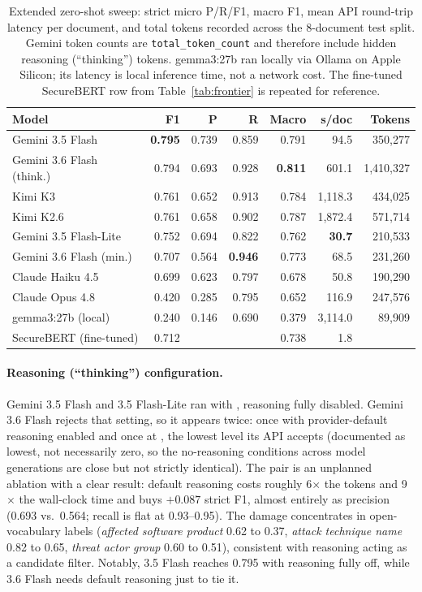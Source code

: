 \documentclass[11pt]{article}
\begin{document}
\begin{table}[t]
\centering
\scriptsize
\setlength{\tabcolsep}{2pt}
\begin{tabular}{lrrrrrr}
\toprule
Model & F1 & P & R & Macro & s/doc & Tokens \\
\midrule
Gemini 3.5 Flash & \textbf{0.795} & 0.739 & 0.859 & 0.791 & 94.5 & 350{,}277 \\
Gemini 3.6 Flash (think.) & 0.794 & 0.693 & 0.928 & \textbf{0.811} & 601.1 & 1{,}410{,}327 \\
Kimi K3 & 0.761 & 0.652 & 0.913 & 0.784 & 1{,}118.3 & 434{,}025 \\
Kimi K2.6 & 0.761 & 0.658 & 0.902 & 0.787 & 1{,}872.4 & 571{,}714 \\
Gemini 3.5 Flash-Lite & 0.752 & 0.694 & 0.822 & 0.762 & \textbf{30.7} & 210{,}533 \\
Gemini 3.6 Flash (min.) & 0.707 & 0.564 & \textbf{0.946} & 0.773 & 68.5 & 231{,}260 \\
Claude Haiku 4.5 & 0.699 & 0.623 & 0.797 & 0.678 & 50.8 & 190{,}290 \\
Claude Opus 4.8 & 0.420 & 0.285 & 0.795 & 0.652 & 116.9 & 247{,}576 \\
gemma3:27b (local) & 0.240 & 0.146 & 0.690 & 0.379 & 3{,}114.0 & 89{,}909 \\
\midrule
SecureBERT (fine-tuned) & 0.712 & & & 0.738 & 1.8 & \\
\bottomrule
\end{tabular}
\caption{Extended zero-shot sweep: strict micro P/R/F1, macro F1, mean
API round-trip latency per document, and total tokens recorded across the
8-document test split. Gemini token counts are
\texttt{total\_token\_count} and therefore include hidden reasoning
(``thinking'') tokens. gemma3:27b ran locally via Ollama on Apple
Silicon; its latency is local inference time, not a network cost. The
fine-tuned SecureBERT row from Table~\ref{tab:frontier} is repeated for
reference.}
\label{tab:frontier-extended}
\end{table}

\paragraph{Reasoning (``thinking'') configuration.} Gemini 3.5 Flash and
3.5 Flash-Lite ran with , reasoning fully
disabled. Gemini 3.6 Flash rejects that setting, so it appears twice: once
with provider-default reasoning enabled and once at
, the lowest level its API accepts
(documented as lowest, not necessarily zero, so the no-reasoning
conditions across model generations are close but not strictly
identical). The pair is an unplanned ablation with a clear result:
default reasoning costs roughly 6$\times$ the tokens and 9$\times$ the
wall-clock time and buys $+0.087$ strict F1, almost entirely as precision
(0.693 vs.\ 0.564; recall is flat at 0.93--0.95). The damage concentrates
in open-vocabulary labels (\emph{affected software product} 0.62 to 0.37,
\emph{attack technique name} 0.82 to 0.65, \emph{threat actor group} 0.60
to 0.51), consistent with reasoning acting as a candidate filter.
Notably, 3.5 Flash reaches 0.795 with reasoning fully off, while 3.6
Flash needs default reasoning just to tie it.
\end{document}
